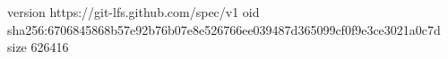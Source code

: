 version https://git-lfs.github.com/spec/v1
oid sha256:6706845868b57e92b76b07e8e526766ee039487d365099cf0f9e3ce3021a0c7d
size 626416
